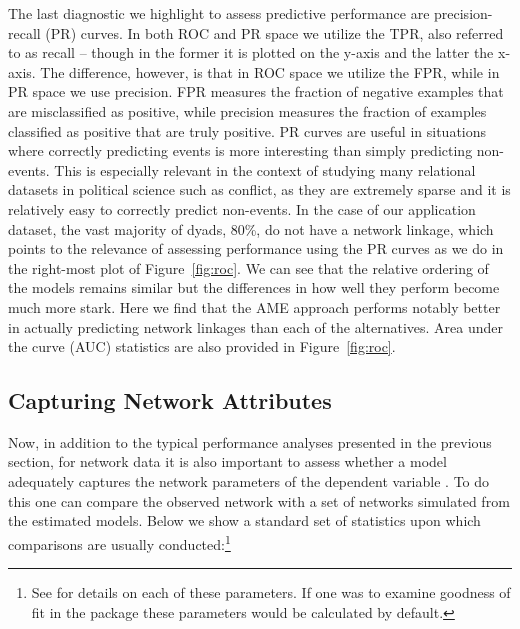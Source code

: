 The last diagnostic we highlight to assess predictive performance are precision-recall (PR) curves. In both ROC and PR space we utilize the TPR, also referred to as recall -- though in the former it is plotted on the y-axis and the latter the x-axis. The difference, however, is that in ROC space we utilize the FPR, while in PR space we use precision. FPR measures the fraction of negative examples that are misclassified as positive, while precision measures the fraction of examples classified as positive that are truly positive. PR curves are useful in situations where correctly predicting events is more interesting than simply predicting non-events. This is especially relevant in the context of studying many relational datasets in political science such as conflict, as they are extremely sparse and it is relatively easy to correctly predict non-events. In the case of our application dataset, the vast majority of dyads, 80\%, do not have a network linkage, which points to the relevance of assessing performance using the PR curves as we do in the right-most plot of Figure~\ref{fig:roc}. We can see that the relative ordering of the models remains similar but the differences in how well they perform become much more stark. Here we find that the AME approach performs notably better in actually predicting network linkages than each of the alternatives. Area under the curve (AUC) statistics are also provided in Figure~\ref{fig:roc}.

\subsection{Capturing Network Attributes}

Now, in addition to the typical performance analyses presented in the previous section, for network data it is also important to assess whether a model adequately captures the network parameters of the dependent variable \citep{hunter:etal:2008}. To do this one can compare the observed network with a set of networks simulated from the estimated models. Below we show a standard set of statistics upon which comparisons are usually conducted:\footnote{See \citet{morris:etal:2008} for details on each of these parameters. If one was to examine goodness of fit in the  package these parameters would be calculated by default.}

